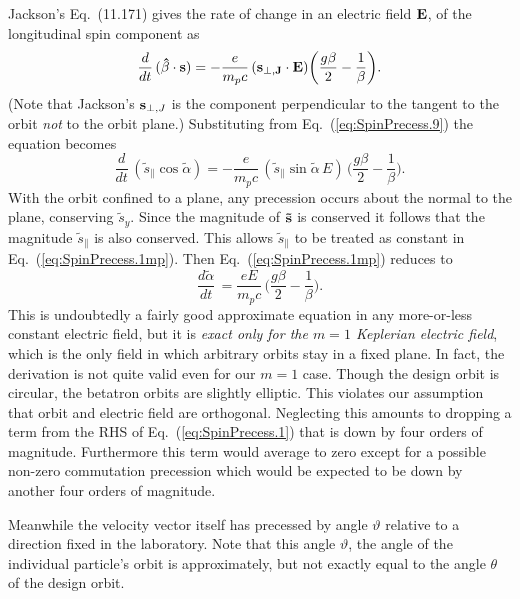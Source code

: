 \documentclass[]{article}
\begin{document}
Jackson's\cite{Jackson} Eq.~(11.171) gives the rate of change 
in an electric field ${\bf E}$, of the longitudinal spin component as
%
\begin{equation}
\frac{d}{dt}\,
({\bf\hat\beta\cdot s})
 =
-\frac{e}{m_pc}\,
({\bf s_{\perp,J}\cdot E})
\bigg(
\frac{g\beta}{2} - \frac{1}{\beta}
\bigg).
\label{eq:SpinPrecess.1}
\end{equation}
%
(Note that Jackson's ${\bf s}_{\perp,J}$ is the component perpendicular
to the tangent to the orbit \emph{not} to the orbit plane.)
Substituting from Eq.~(\ref{eq:SpinPrecess.9}) the 
equation becomes
%
\begin{equation}
\frac{d}{dt}\,
(\tilde s_{\parallel}\cos\tilde\alpha)
 =
-\frac{e}{m_pc}\,
(\tilde s_{\parallel}\sin\tilde\alpha\,E)\,
\bigg(
\frac{g\beta}{2} - \frac{1}{\beta}
\bigg).
\label{eq:SpinPrecess.1mp}
\end{equation}
%
With the orbit confined to a plane,
any precession occurs about the normal to the plane,
conserving $\tilde s_y$. Since the magnitude of ${\bf \tilde s}$ is
conserved it follows that the magnitude $\tilde s_{\parallel}$
is also conserved. This allows $\tilde s_{\parallel}$ to be 
treated as constant in Eq.~(\ref{eq:SpinPrecess.1mp}).
Then Eq.~(\ref{eq:SpinPrecess.1mp}) reduces to
%
\begin{equation}
\frac{d\tilde\alpha}{dt}\,
 =
\frac{eE}{m_pc}\,
\bigg(
\frac{g\beta}{2} - \frac{1}{\beta}
\bigg).
\label{eq:SpinPrecess.2}
\end{equation}
%
This is undoubtedly a fairly good approximate equation in any
more-or-less constant electric field, but it is \emph{exact only for
the $m=1$ Keplerian electric field}, which is the only field
in which arbitrary orbits stay in a fixed plane.  In fact, the
derivation is not quite valid even for our $m=1$ case.  Though
the design orbit is circular, the betatron orbits are slightly
elliptic. This violates our assumption that orbit and electric 
field are orthogonal. Neglecting this amounts to dropping a 
term from the RHS of Eq.~(\ref{eq:SpinPrecess.1}) that is
down by four orders of magnitude. Furthermore this term would 
average to zero except for a possible non-zero
commutation precession which would be expected to be down by 
another four orders of magnitude.

Meanwhile the velocity vector itself has precessed by angle 
$\vartheta$ relative to a direction fixed in the laboratory. 
Note that this angle $\vartheta$, the angle of the 
individual particle's orbit is approximately, but not exactly 
equal to the angle $\theta$ of the design orbit.
\end{document}
